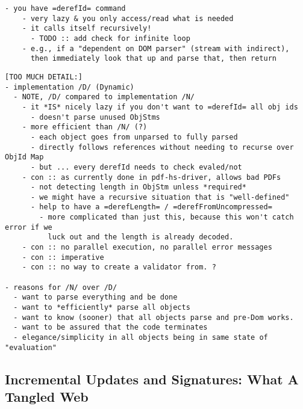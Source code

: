 \begin{lstlisting}[style=meta]
  - you have =derefId= command
    - very lazy & you only access/read what is needed
    - it calls itself recursively!
      - TODO :: add check for infinite loop
    - e.g., if a "dependent on DOM parser" (stream with indirect), 
      then immediately look that up and parse that, then return
\end{lstlisting}

\begin{lstlisting}[style=meta]
[TOO MUCH DETAIL:]
- implementation /D/ (Dynamic)
  - NOTE, /D/ compared to implementation /N/     
    - it *IS* nicely lazy if you don't want to =derefId= all obj ids
      - doesn't parse unused ObjStms
    - more efficient than /N/ (?)
      - each object goes from unparsed to fully parsed
      - directly follows references without needing to recurse over ObjId Map
      - but ... every derefId needs to check evaled/not
    - con :: as currently done in pdf-hs-driver, allows bad PDFs
      - not detecting length in ObjStm unless *required*
      - we might have a recursive situation that is "well-defined"
      - help to have a =derefLength= / =derefFromUncompressed=
        - more complicated than just this, because this won't catch error if we
          luck out and the length is already decoded.
    - con :: no parallel execution, no parallel error messages
    - con :: imperative
    - con :: no way to create a validator from. ?
            
- reasons for /N/ over /D/
  - want to parse everything and be done
  - want to *efficiently* parse all objects
  - want to know (sooner) that all objects parse and pre-Dom works.
  - want to be assured that the code terminates 
  - elegance/simplicity in all objects being in same state of "evaluation"
\end{lstlisting}

\subsection{Incremental Updates and Signatures: What A Tangled Web }
\label{sec:updates-and-signatures}


